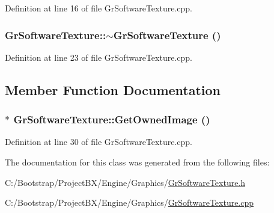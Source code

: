 Definition at line 16 of file GrSoftwareTexture.cpp.\hypertarget{class_gr_software_texture_349387c7b29661c08942421f493b1987}{
\subsubsection[{$\sim$GrSoftwareTexture}]{\setlength{\rightskip}{0pt plus 5cm}GrSoftwareTexture::$\sim$GrSoftwareTexture ()}}
\label{class_gr_software_texture_349387c7b29661c08942421f493b1987}




Definition at line 23 of file GrSoftwareTexture.cpp.

\subsection{Member Function Documentation}
\hypertarget{class_gr_software_texture_e62df5b1a2a809fc70dbdeb4c59b4310}{
\subsubsection[{GetOwnedImage}]{ $\ast$ GrSoftwareTexture::GetOwnedImage ()}}
\label{class_gr_software_texture_e62df5b1a2a809fc70dbdeb4c59b4310}




Definition at line 30 of file GrSoftwareTexture.cpp.

The documentation for this class was generated from the following files:\begin{CompactItemize}
\item 
C:/Bootstrap/ProjectBX/Engine/Graphics/\hyperlink{_gr_software_texture_8h}{GrSoftwareTexture.h}\item 
C:/Bootstrap/ProjectBX/Engine/Graphics/\hyperlink{_gr_software_texture_8cpp}{GrSoftwareTexture.cpp}\end{CompactItemize}
